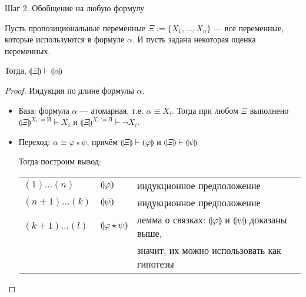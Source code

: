 \documentclass[aspectratio=169]{beamer}
\begin{document}
\begin{frame}{Шаг 2. Обобщение на любую формулу}

\begin{lemmarus}
Пусть пропозициональные переменные $\Xi := \{X_1, \dots, X_n\}$ ---
все переменные, которые используются в формуле $\alpha$. И пусть
задана некоторая оценка переменных.

Тогда, $\llparenthesis \Xi \rrparenthesis \vdash\llparenthesis\alpha\rrparenthesis$
\end{lemmarus}\pause

\begin{proof}Индукция по длине формулы $\alpha$.
\begin{itemize}
\item База: формула $\alpha$ --- атомарная, т.е. $\alpha \equiv X_i$. Тогда при любом $\Xi$ выполнено 
$\llparenthesis\Xi\rrparenthesis^{X_i := \text{И}} \vdash X_i$ и $\llparenthesis\Xi\rrparenthesis^{X_i := \text{Л}} \vdash \neg X_i$.
\item Переход: $\alpha \equiv \varphi\star\psi$, причём $\llparenthesis\Xi\rrparenthesis\vdash\llparenthesis\varphi\rrparenthesis$
и $\llparenthesis\Xi\rrparenthesis\vdash\llparenthesis\psi\rrparenthesis$\pause

Тогда построим вывод: 

\begin{tabular}{lll}
$(1)\dots(n)$ & $\llparenthesis\varphi\rrparenthesis$ & индукционное предположение\\
$(n+1)\dots(k)$ & $\llparenthesis\psi\rrparenthesis$ & индукционное предположение\\
$(k+1)\dots(l)$ & $\llparenthesis\varphi\star\psi\rrparenthesis$ & 
  лемма о связках: $\llparenthesis\varphi\rrparenthesis$ и $\llparenthesis\psi\rrparenthesis$ доказаны выше,\\
  & & значит, их можно использовать как гипотезы
\end{tabular}
\end{itemize}
\end{proof}

\end{frame}
\end{document}
